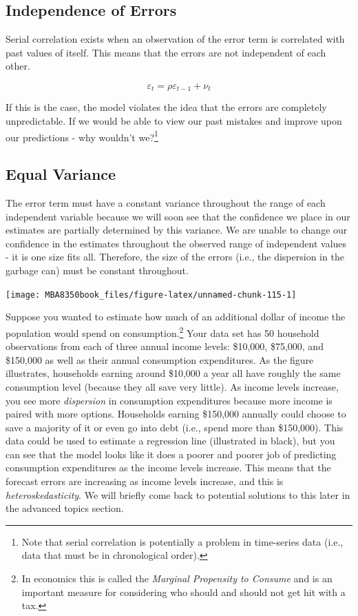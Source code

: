 \documentclass[
]{book}
\begin{document}
\hypertarget{independence-of-errors}{%
\subsection{Independence of Errors}\label{independence-of-errors}}

Serial correlation exists when an observation of the error term is correlated with past values of itself. This means that the errors are not independent of each other.

\[\varepsilon_t=\rho \varepsilon_{t-1}+\nu_t\]

If this is the case, the model violates the idea that the errors are completely unpredictable. If we would be able to view our past mistakes and improve upon our predictions - why wouldn't we?\footnote{Note that serial correlation is potentially a problem in time-series data (i.e., data that must be in chronological order).}

\hypertarget{equal-variance}{%
\subsection{Equal Variance}\label{equal-variance}}

The error term must have a constant variance throughout the range of each independent variable because we will soon see that the confidence we place in our estimates are partially determined by this variance. We are unable to change our confidence in the estimates throughout the observed range of independent values - it is one size fits all. Therefore, the size of the errors (i.e., the dispersion in the garbage can) must be constant throughout.

\begin{center}\texttt{[image: MBA8350book\_files/figure-latex/unnamed-chunk-115-1]} \end{center}

Suppose you wanted to estimate how much of an additional dollar of income the population would spend on consumption.\footnote{In economics this is called the \emph{Marginal Propensity to Consume} and is an important measure for considering who should and should not get hit with a tax.} Your data set has 50 household observations from each of three annual income levels: \$10,000, \$75,000, and \$150,000 as well as their annual consumption expenditures. As the figure illustrates, households earning around \$10,000 a year all have roughly the same consumption level (because they all save very little). As income levels increase, you see more \emph{dispersion} in consumption expenditures because more income is paired with more options. Households earning \$150,000 annually could choose to save a majority of it or even go into debt (i.e., spend more than \$150,000). This data could be used to estimate a regression line (illustrated in black), but you can see that the model looks like it does a poorer and poorer job of predicting consumption expenditures as the income levels increase. This means that the forecast errors are increasing as income levels increase, and this is \emph{heteroskedasticity}. We will briefly come back to potential solutions to this later in the advanced topics section.
\end{document}
